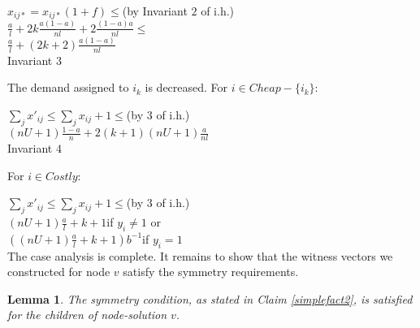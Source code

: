 \documentclass[11pt]{article}\usepackage{amsmath}
\newtheorem{lemma}{Lemma}[section]
\begin{document}
\noindent
$x_{ij*}=x_{ij*}(1+f)\leq$\hfill (by Invariant $2$ of i.h.)\\
$\frac{a}{l}+2k\frac{a(1-a)}{nl}+2\frac{(1-a)a}{nl}\leq$\\
$\frac{a}{l}+(2k+2)\frac{a(1-a)}{nl}$\\

{\sf Invariant $3$}

The demand assigned to $i_k$ is decreased. For $i\in Cheap - \{i_k\}$:

\noindent
$\sum_j x'_{ij}\leq \sum_j x_{ij} + 1\leq$\hfill (by $3$ of i.h.)\\
$(nU+1)\frac{1-a}{n}+2(k+1)(nU+1)\frac{a}{nl}$\\

{\sf Invariant $4$}

For $i\in Costly$:

\noindent
$\sum_j x'_{ij}\leq \sum_j x_{ij} + 1\leq$\hfill (by $3$ of i.h.)\\
$(nU+1)\frac{a}{l}+k+1$\hfill if $y_i \neq 1$ or \\
$((nU+1)\frac{a}{l}+k+1)b^{-1}$\hfill if $y_i =1$\\ 


\medskip \medskip 
The case analysis is complete. 
It remains to show that the witness vectors we constructed for node
$v$ satisfy the symmetry requirements. 




\begin{lemma}\label{symmetry}
The symmetry condition, as stated in Claim \ref{simplefact2},
 is satisfied  for  the children of node-solution $v.$
\end{lemma}
\end{document}
